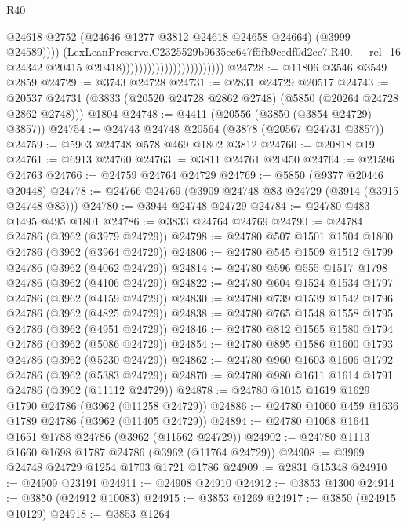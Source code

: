 \begin{lexlean}{R40}
\begin{coremodule}
                                                        @24618
                                                        @2752
                                                        (@24646 @1277 @3812 @24618 @24658 @24664)
                                                        (@3999 @24589))))
                                                  (LexLeanPreserve.C2325529b9635cc647f5fb9cedf0d2cc7.R40.__rel_16
                                                    @24342
                                                    @20415
                                                    @20418))))))))))))))))))))))))
@24728 := @11806 @3546 @3549 @2859
@24729 := @3743 @24728
@24731 := @2831 @24729 @20517
@24743 := @20537
    @24731
    (@3833 (@20520 @24728 @2862 @2748) (@5850 (@20264 @24728 @2862 @2748)))
    @1804
@24748 := @4411 (@20556 (@3850 (@3854 @24729) @3857))
@24754 := @24743 @24748 @20564 (@3878 (@20567 @24731 @3857))
@24759 := @5903 @24748 @578 @469 @1802 @3812
@24760 := @20818 @19
@24761 := @6913 @24760
@24763 := @3811 @24761 @20450
@24764 := @21596 @24763
@24766 := @24759 @24764 @24729
@24769 := @5850 (@9377 @20446 @20448)
@24778 := @24766 @24769 (@3909 @24748 @83 @24729 (@3914 (@3915 @24748 @83)))
@24780 := @3944 @24748 @24729
@24784 := @24780 @483 @1495 @495 @1801
@24786 := @3833 @24764 @24769
@24790 := @24784 @24786 (@3962 (@3979 @24729))
@24798 := @24780 @507 @1501 @1504 @1800 @24786 (@3962 (@3964 @24729))
@24806 := @24780 @545 @1509 @1512 @1799 @24786 (@3962 (@4062 @24729))
@24814 := @24780 @596 @555 @1517 @1798 @24786 (@3962 (@4106 @24729))
@24822 := @24780 @604 @1524 @1534 @1797 @24786 (@3962 (@4159 @24729))
@24830 := @24780 @739 @1539 @1542 @1796 @24786 (@3962 (@4825 @24729))
@24838 := @24780 @765 @1548 @1558 @1795 @24786 (@3962 (@4951 @24729))
@24846 := @24780 @812 @1565 @1580 @1794 @24786 (@3962 (@5086 @24729))
@24854 := @24780 @895 @1586 @1600 @1793 @24786 (@3962 (@5230 @24729))
@24862 := @24780 @960 @1603 @1606 @1792 @24786 (@3962 (@5383 @24729))
@24870 := @24780 @980 @1611 @1614 @1791 @24786 (@3962 (@11112 @24729))
@24878 := @24780 @1015 @1619 @1629 @1790 @24786 (@3962 (@11258 @24729))
@24886 := @24780 @1060 @459 @1636 @1789 @24786 (@3962 (@11405 @24729))
@24894 := @24780 @1068 @1641 @1651 @1788 @24786 (@3962 (@11562 @24729))
@24902 := @24780 @1113 @1660 @1698 @1787 @24786 (@3962 (@11764 @24729))
@24908 := @3969 @24748 @24729 @1254 @1703 @1721 @1786
@24909 := @2831 @15348
@24910 := @24909 @23191
@24911 := @24908 @24910
@24912 := @3853 @1300
@24914 := @3850 (@24912 @10083)
@24915 := @3853 @1269
@24917 := @3850 (@24915 @10129)
@24918 := @3853 @1264

\end{coremodule}
\end{lexlean}
